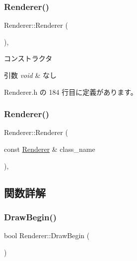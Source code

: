 \subsubsection{\texorpdfstring{Renderer()}{Renderer()}\hspace{0.1cm}{\footnotesize\ttfamily [1/2]}}
{\footnotesize\ttfamily Renderer\+::\+Renderer (\begin{DoxyParamCaption}{ }\end{DoxyParamCaption})\hspace{0.3cm}{\ttfamily [inline]}, {\ttfamily [private]}}



コンストラクタ 


\begin{DoxyParams}{引数}
{\em void} & なし \\
\hline
\end{DoxyParams}


 Renderer.\+h の 184 行目に定義があります。

\mbox{\label{class_renderer_a1e7732f4c952f3c13d9bb03a7510b7aa}} 
\subsubsection{\texorpdfstring{Renderer()}{Renderer()}\hspace{0.1cm}{\footnotesize\ttfamily [2/2]}}
{\footnotesize\ttfamily Renderer\+::\+Renderer (\begin{DoxyParamCaption}\item[{const \mbox{\hyperlink{class_renderer}{Renderer}} \&}]{class\+\_\+name }\end{DoxyParamCaption})\hspace{0.3cm}{\ttfamily [private]}, {\ttfamily [delete]}}



\subsection{関数詳解}
\mbox{\label{class_renderer_af420951c9c163f1151bd6600df204cee}} 
\subsubsection{\texorpdfstring{Draw\+Begin()}{DrawBegin()}}
{\footnotesize\ttfamily bool Renderer\+::\+Draw\+Begin (\begin{DoxyParamCaption}{ }\end{DoxyParamCaption})}



